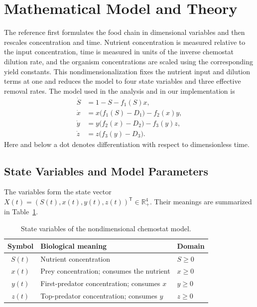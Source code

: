 \section{Mathematical Model and Theory}
\label{sec:mathematical-model}

The reference first formulates the food chain in dimensional variables and
then rescales concentration and time.  Nutrient concentration is measured
relative to the input concentration, time is measured in units of the inverse
chemostat dilution rate, and the organism concentrations are scaled using the
corresponding yield constants.  This nondimensionalization fixes the nutrient
input and dilution terms at one and reduces the model to four state variables
and three effective removal rates.  The model used in the analysis and in our
implementation is
\begin{equation}
\label{eq:model}
\begin{aligned}
\dot S &= 1-S-f_1(S)x,\\
\dot x &= x\bigl(f_1(S)-D_1\bigr)-f_2(x)y,\\
\dot y &= y\bigl(f_2(x)-D_2\bigr)-f_3(y)z,\\
\dot z &= z\bigl(f_3(y)-D_3\bigr).
\end{aligned}
\end{equation}
Here and below a dot denotes differentiation with respect to dimensionless
time.

\subsection{State Variables and Model Parameters}

The variables form the state vector
\(
X(t)=(S(t),x(t),y(t),z(t))^{\mathsf T}\in\mathbb{R}_+^4
\).
Their meanings are summarized in Table~\ref{tab:model-variables}.

\begin{table}[htbp]
\centering
\caption{State variables of the nondimensional chemostat model.}
\label{tab:model-variables}
\begin{tabular}{cll}
\toprule
Symbol & Biological meaning & Domain \\
\midrule
\(S(t)\) & Nutrient concentration & \(S\geq 0\) \\
\(x(t)\) & Prey concentration; consumes the nutrient & \(x\geq 0\) \\
\(y(t)\) & First-predator concentration; consumes \(x\) & \(y\geq 0\) \\
\(z(t)\) & Top-predator concentration; consumes \(y\) & \(z\geq 0\) \\
\bottomrule
\end{tabular}
\end{table}

